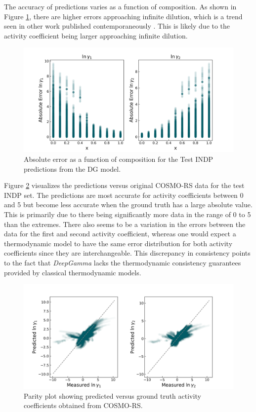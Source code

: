 The accuracy of predictions varies as a function of composition. As shown in Figure \ref{fig:absolute_error_composition}, there are higher errors approaching infinite dilution, which is a trend seen in other work published contemporaneously \cite{Winter2022}. This is likely due to the activity coefficient being larger approaching infinite dilution.

\begin{figure}
    \centering
    \includegraphics[width=\textwidth]{gfx/Chapter07/DG_test_indp_absolute_error_vs_composition.png}
    \caption{Absolute error as a function of composition for the Test INDP predictions from the DG model.}
    \label{fig:absolute_error_composition}
\end{figure}

Figure \ref{fig:dg_test_indp_parity_plot} visualizes the predictions versus original COSMO-RS data for the test INDP set. The predictions are most accurate for activity coefficients between 0 and 5 but become less accurate when the ground truth has a large absolute value. This is primarily due to there being significantly more data in the range of 0 to 5 than the extremes. There also seems to be a variation in the errors between the data for the first and second activity coefficient, whereas one would expect a thermodynamic model to have the same error distribution for both activity coefficients since they are interchangeable. This discrepancy in consistency points to the fact that \textit{DeepGamma} lacks the thermodynamic consistency guarantees provided by classical thermodynamic models.
 
\begin{figure}
    \centering
    \includegraphics[width=\textwidth]{gfx/Chapter07/DG_test_indp_parity_plot.png}
    \caption{Parity plot showing predicted versus ground truth activity coefficients obtained from COSMO-RS.}
    \label{fig:dg_test_indp_parity_plot}
\end{figure}

